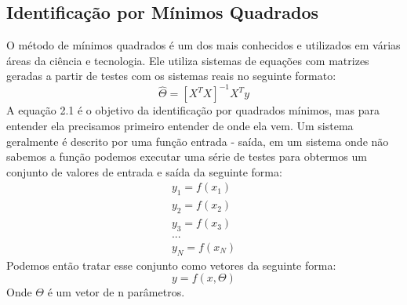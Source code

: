 \subsection{Identificação por Mínimos Quadrados}
O método de mínimos quadrados é um dos mais conhecidos e utilizados em várias áreas da ciência e tecnologia. Ele utiliza sistemas de equações com matrizes geradas a partir de testes com os sistemas reais no seguinte formato:
\begin{equation}
	\hat{\Theta}=[X^TX]^{-1}X^Ty
\end{equation}
A equação 2.1 é o objetivo da identificação por quadrados mínimos, mas para entender ela precisamos primeiro entender de onde ela vem.
\newline 
Um sistema geralmente é descrito por uma função entrada - saída, em um sistema onde não sabemos a função podemos executar uma série de testes para obtermos um conjunto de valores de entrada e saída da seguinte forma:
\begin{equation}
\begin{array}{c}
y_1=f(x_1) \\
y_2=f(x_2) \\
y_3=f(x_3) \\
... \\
y_N=f(x_N)
\end{array}
\end{equation}
Podemos então tratar esse conjunto como vetores da seguinte forma:
\begin{equation}
y=f(x,\Theta)
\end{equation}
Onde $ \Theta $ é um vetor de n parâmetros.


















